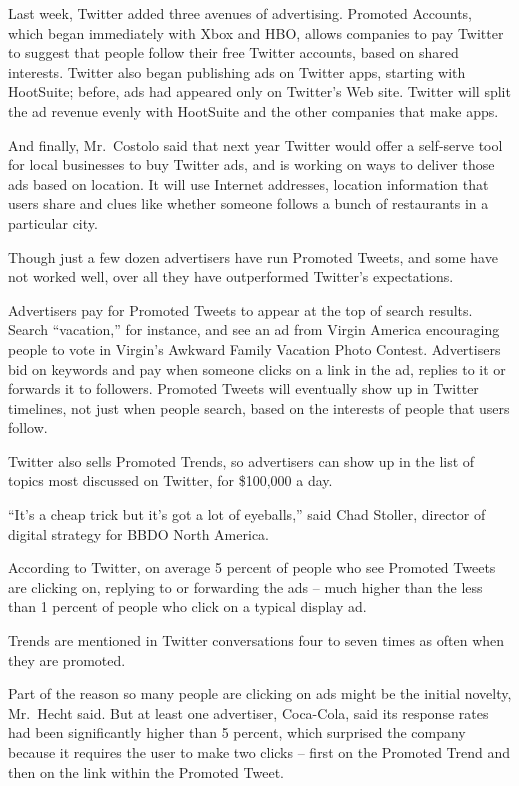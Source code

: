 ﻿\documentclass[12pt]{article}
\begin{document}
Last week, Twitter added three avenues of advertising. Promoted Accounts, which began immediately
with Xbox and HBO, allows companies to pay Twitter to suggest that people follow their free Twitter
accounts, based on shared interests. Twitter also began publishing ads on Twitter apps, starting
with HootSuite; before, ads had appeared only on Twitter's Web site. Twitter will split the ad
revenue evenly with HootSuite and the other companies that make apps.

And finally, Mr.~Costolo said that next year Twitter would offer a self-serve tool for local
businesses to buy Twitter ads, and is working on ways to deliver those ads based on location. It
will use Internet addresses, location information that users share and clues like whether someone
follows a bunch of restaurants in a particular city.

Though just a few dozen advertisers have run Promoted Tweets, and some have not worked well, over
all they have outperformed Twitter's expectations.

Advertisers pay for Promoted Tweets to appear at the top of search results. Search ``vacation,'' for
instance, and see an ad from Virgin America encouraging people to vote in Virgin's Awkward Family
Vacation Photo Contest. Advertisers bid on keywords and pay when someone clicks on a link in the ad,
replies to it or forwards it to followers. Promoted Tweets will eventually show up in Twitter
timelines, not just when people search, based on the interests of people that users follow.

Twitter also sells Promoted Trends, so advertisers can show up in the list of topics most discussed
on Twitter, for \$100,000 a day.

``It's a cheap trick but it's got a lot of eyeballs,'' said Chad Stoller, director of digital
strategy for BBDO North America.

According to Twitter, on average 5 percent of people who see Promoted Tweets are clicking on,
replying to or forwarding the ads -- much higher than the less than 1 percent of people who click on
a typical display ad.

Trends are mentioned in Twitter conversations four to seven times as often when they are promoted.

Part of the reason so many people are clicking on ads might be the initial novelty, Mr.~Hecht said.
But at least one advertiser, Coca-Cola, said its response rates had been significantly higher than 5
percent, which surprised the company because it requires the user to make two clicks -- first on the
Promoted Trend and then on the link within the Promoted Tweet.
\end{document}
